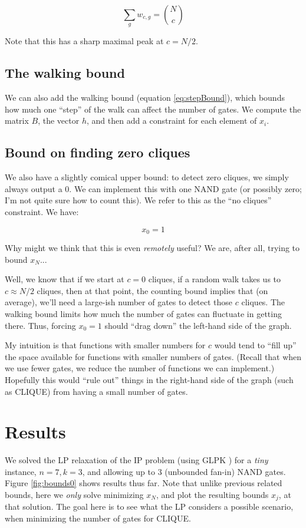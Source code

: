\documentclass[12pt]{article}
\theoremstyle{definition}
\begin{document}
\[
\sum_g w_{c,g} = {N \choose c}
\]

Note that this has a sharp maximal peak at $c = N/2$.

\subsection{The walking bound}

We can also add the walking bound (equation \ref{eq:stepBound}), which bounds how much
one ``step'' of the walk can affect the number of gates.
We compute the matrix $B$, the vector $h$, and then add a constraint for each element of $x_i$.

\subsection{Bound on finding zero cliques}

We also have a slightly comical upper bound:
to detect zero cliques, we simply always
output a 0. We can implement this with one NAND gate (or possibly zero;
I'm not quite sure how to count this). We refer to this as the
``no cliques'' constraint. We have:

\[
x_0 = 1
\]

Why might we think that this is even {\em remotely} useful? We are, after
all, trying to bound $x_N$...

Well, we know that if we start at $c=0$ cliques, if a random walk takes us to
$c \approx N/2$ cliques, then at that point, the counting bound implies that
(on average), we'll need a large-ish number of gates to detect those $c$ cliques.
The walking bound limits how much the number of gates can fluctuate
in getting there. Thus, forcing $x_0=1$ should ``drag down'' the left-hand side of the graph.

My intuition is that functions with smaller numbers for $c$ would
tend to ``fill up'' the space available for functions with smaller numbers of gates.
(Recall that when we use fewer gates, we reduce the number of functions we can implement.)
Hopefully this would ``rule out'' things in the right-hand side of the graph (such as CLIQUE)
from having a small number of gates.

\section{Results}

We solved the LP relaxation of the IP problem (using GLPK \cite{glpk})
for a {\em tiny} instance, $n=7, k=3$, and allowing up to 3 (unbounded fan-in)
NAND gates.
Figure \ref{fig:bounds0} shows results thus far.
Note that unlike previous related bounds, here we {\em only} solve minimizing
$x_N$, and plot the resulting bounds $x_j$, at that solution. The
goal here is to see what the LP considers a possible scenario, when
minimizing the number of gates for CLIQUE.
\end{document}
